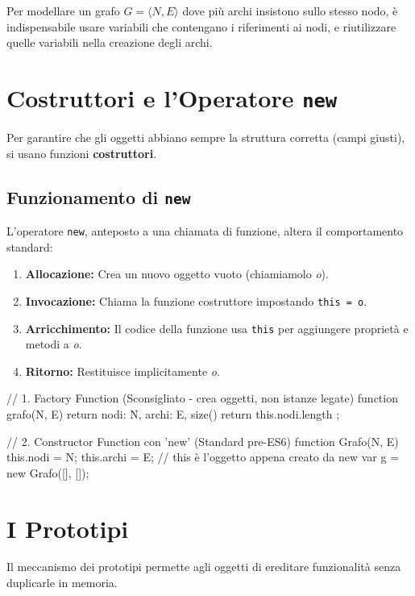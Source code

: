 Per modellare un grafo $G=\langle N,E\rangle$ dove più archi insistono sullo stesso nodo, è indispensabile usare variabili che contengano i riferimenti ai nodi, e riutilizzare quelle variabili nella creazione degli archi.

\section{Costruttori e l'Operatore \texttt{new}}
Per garantire che gli oggetti abbiano sempre la struttura corretta (campi giusti), si usano funzioni \textbf{costruttori}.

\subsection{Funzionamento di \texttt{new}}
L'operatore \texttt{new}, anteposto a una chiamata di funzione, altera il comportamento standard:
\begin{enumerate}
    \item \textbf{Allocazione:} Crea un nuovo oggetto vuoto (chiamiamolo \textit{o}).
    \item \textbf{Invocazione:} Chiama la funzione costruttore impostando \texttt{this = o}.
    \item \textbf{Arricchimento:} Il codice della funzione usa \texttt{this} per aggiungere proprietà e metodi a \textit{o}.
    \item \textbf{Ritorno:} Restituisce implicitamente \textit{o}.
\end{enumerate}

\begin{jsbox}
// 1. Factory Function (Sconsigliato - crea oggetti, non istanze legate)
function grafo(N, E) {
    return { nodi: N, archi: E, size() { return this.nodi.length } };
}

// 2. Constructor Function con 'new' (Standard pre-ES6)
function Grafo(N, E) {
    this.nodi = N;
    this.archi = E;
    // this è l'oggetto appena creato da new
}
var g = new Grafo([], []);
\end{jsbox}

\section{I Prototipi}
Il meccanismo dei prototipi permette agli oggetti di ereditare funzionalità senza duplicarle in memoria.

